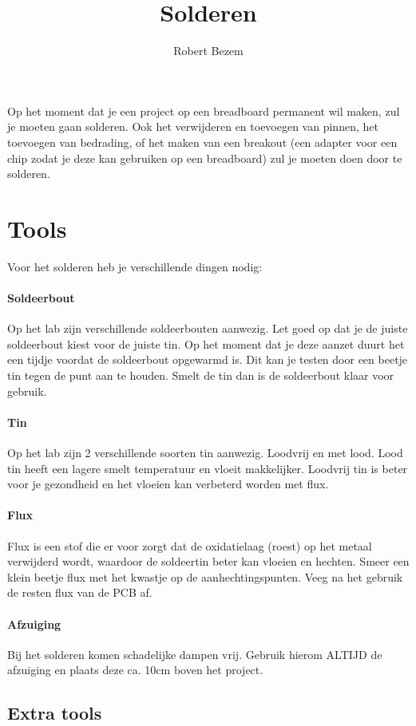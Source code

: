 \documentclass{guide}
\title{Solderen}
\author{Robert Bezem}
\begin{document}
Op het moment dat je een project op een breadboard permanent wil maken, zul je moeten gaan solderen. Ook het verwijderen en toevoegen van pinnen, het toevoegen van bedrading, of het maken van een breakout (een adapter voor een chip zodat je deze kan gebruiken op een breadboard) zul je moeten doen door te solderen.
\section{Tools}
Voor het solderen heb je verschillende dingen nodig:

\paragraph{Soldeerbout} Op het lab zijn verschillende soldeerbouten aanwezig. Let goed op dat je de juiste soldeerbout kiest voor de juiste tin. Op het moment dat je deze aanzet duurt het een tijdje voordat de soldeerbout opgewarmd is. Dit kan je testen door een beetje tin tegen de punt aan te houden. Smelt de tin dan is de soldeerbout klaar voor gebruik.

\paragraph{Tin} Op het lab zijn 2 verschillende soorten tin aanwezig. Loodvrij en met lood. Lood tin heeft een lagere smelt temperatuur en vloeit makkelijker. Loodvrij tin is beter voor je gezondheid en het vloeien kan verbeterd worden met flux.

\paragraph{Flux} Flux is een stof die er voor zorgt dat de oxidatielaag (roest) op het metaal verwijderd wordt, waardoor de soldeertin beter kan vloeien en hechten. Smeer een klein beetje flux met het kwastje op de aanhechtingspunten. Veeg na het gebruik de resten flux van de PCB af.

\paragraph{Afzuiging}
Bij het solderen komen schadelijke dampen vrij. Gebruik hierom ALTIJD de afzuiging en plaats deze ca. 10cm boven het project.
\subsection{Extra tools}
\end{document}
